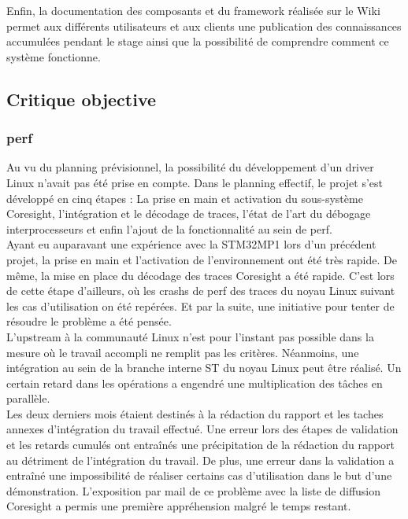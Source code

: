 Enfin, la documentation des composants et du framework réalisée sur le Wiki
permet aux différents utilisateurs et aux clients une publication des
connaissances accumulées pendant le stage ainsi que la possibilité de
comprendre comment ce système fonctionne.

\subsection{Critique objective}
\label{sec:perf_criticism}

\subsubsection{perf}

Au vu du planning prévisionnel, la possibilité du développement d'un driver
Linux n'avait pas été prise en compte. Dans le planning effectif, le projet
s'est développé en cinq étapes : La prise en main et activation du
sous-système Coresight, l'intégration et le décodage de traces, l'état de
l'art du débogage interprocesseurs et enfin l'ajout de la fonctionnalité au
sein de perf. \\

Ayant eu auparavant une expérience avec la STM32MP1 lors d'un précédent
projet, la prise en main et l'activation de l'environnement ont été très
rapide.  De même, la mise en place du décodage des traces Coresight a été
rapide. C'est lors de cette étape d'ailleurs, où les crashs de perf des traces
du noyau Linux suivant les cas d'utilisation on été repérées. Et par la
suite, une initiative pour tenter de résoudre le problème a été pensée. \\

L'upstream à la communauté Linux n'est pour l'instant pas possible dans la
mesure où le travail accompli ne remplit pas les critères. Néanmoins, une
intégration au sein de la branche interne ST du noyau Linux peut être réalisé.
Un certain retard dans les opérations a engendré une multiplication des tâches
en parallèle. \\

Les deux derniers mois étaient destinés à la rédaction du rapport et les
taches annexes d'intégration du travail effectué. Une erreur lors des étapes
de validation et les retards cumulés ont entraînés une précipitation de la
rédaction du rapport au détriment de l'intégration du travail. De plus, une
erreur dans la validation a entraîné une impossibilité de réaliser certains
cas d'utilisation dans le but d'une démonstration. L'exposition par mail de ce
problème avec la liste de diffusion Coresight a permis une première
appréhension malgré le temps restant. \\

